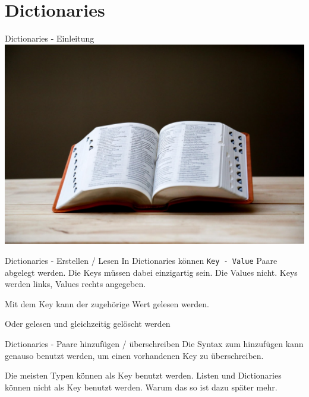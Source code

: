\section{Dictionaries}
\begin{frame}{Dictionaries - Einleitung}
	\includegraphics[width=\linewidth]{resources/03bool_fun_dict/lexikon.jpeg}
\end{frame}
\begin{frame}{Dictionaries - Erstellen / Lesen}
	In Dictionaries können \alert{\texttt{Key - Value}} Paare abgelegt werden.
	\linebreak
	Die Keys müssen dabei einzigartig sein. Die Values nicht.
	\linebreak
	Keys werden links, Values rechts angegeben.
	
	Mit dem Key kann der zugehörige Wert gelesen werden.
	
	Oder gelesen und gleichzeitig gelöscht werden
	
	
\end{frame}
\begin{frame}{Dictionaries - Paare hinzufügen / überschreiben}
	Die Syntax zum hinzufügen kann genauso benutzt werden, um einen vorhandenen Key zu überschreiben.
	
	
	Die meisten Typen können als Key benutzt werden. Listen und Dictionaries können nicht als Key benutzt werden. Warum das so ist dazu später mehr.
	
\end{frame}


